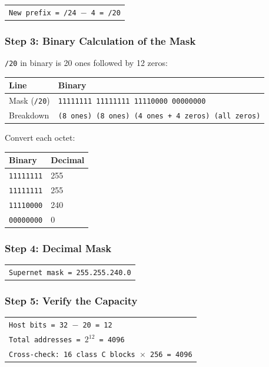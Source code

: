 \documentclass[11pt,a4paper]{article}
\begin{document}
\begin{tabularx}{\textwidth}{@{}X@{}}
\texttt{New prefix = /24 $-$ 4 = /20} \\
\end{tabularx}

\subsubsection*{Step 3: Binary Calculation of the Mask}

\texttt{/20} in binary is 20 ones followed by 12 zeros:

\begin{tabularx}{\textwidth}{@{}lX@{}}
\toprule
\rowcolor{tablehead}\textbf{Line} & \textbf{Binary} \\
\midrule
Mask (\texttt{/20}) & \texttt{11111111 11111111 11110000 00000000} \\
Breakdown & \texttt{(8 ones) (8 ones) (4 ones + 4 zeros) (all zeros)} \\
\bottomrule
\end{tabularx}

Convert each octet:

\begin{tabularx}{\textwidth}{@{}lX@{}}
\toprule
\rowcolor{tablehead}\textbf{Binary} & \textbf{Decimal} \\
\midrule
\texttt{11111111} & 255 \\
\texttt{11111111} & 255 \\
\texttt{11110000} & 240 \\
\texttt{00000000} & 0 \\
\bottomrule
\end{tabularx}

\subsubsection*{Step 4: Decimal Mask}

\begin{tabularx}{\textwidth}{@{}X@{}}
\texttt{Supernet mask = 255.255.240.0} \\
\end{tabularx}

\subsubsection*{Step 5: Verify the Capacity}

\begin{tabularx}{\textwidth}{@{}X@{}}
\texttt{Host bits = 32 $-$ 20 = 12} \\
\texttt{Total addresses = $2^{12}$ = 4096} \\
\texttt{Cross-check: 16 class C blocks $\times$ 256 = 4096} \\
\end{tabularx}
\end{document}
